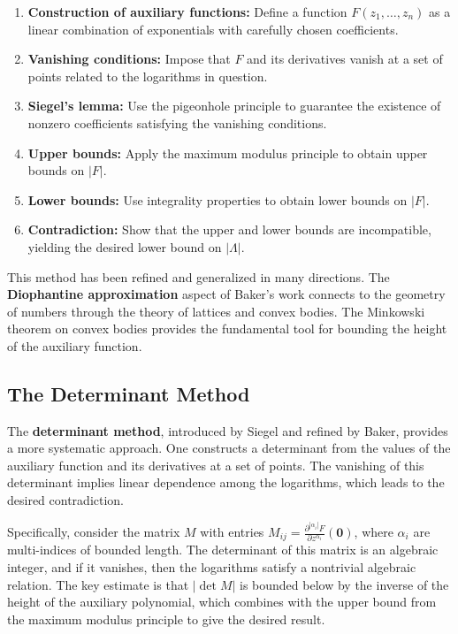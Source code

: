\begin{enumerate}
    \item \textbf{Construction of auxiliary functions:} Define a function $F(z_1, \ldots, z_n)$ as a linear combination of exponentials with carefully chosen coefficients.
    \item \textbf{Vanishing conditions:} Impose that $F$ and its derivatives vanish at a set of points related to the logarithms in question.
    \item \textbf{Siegel's lemma:} Use the pigeonhole principle to guarantee the existence of nonzero coefficients satisfying the vanishing conditions.
    \item \textbf{Upper bounds:} Apply the maximum modulus principle to obtain upper bounds on $|F|$.
    \item \textbf{Lower bounds:} Use integrality properties to obtain lower bounds on $|F|$.
    \item \textbf{Contradiction:} Show that the upper and lower bounds are incompatible, yielding the desired lower bound on $|\Lambda|$.
\end{enumerate}

This method has been refined and generalized in many directions. The \textbf{Diophantine approximation} aspect of Baker's work connects to the geometry of numbers through the theory of lattices and convex bodies. The Minkowski theorem on convex bodies provides the fundamental tool for bounding the height of the auxiliary function.

\subsection*{The Determinant Method}

The \textbf{determinant method}, introduced by Siegel and refined by Baker, provides a more systematic approach. One constructs a determinant from the values of the auxiliary function and its derivatives at a set of points. The vanishing of this determinant implies linear dependence among the logarithms, which leads to the desired contradiction.

Specifically, consider the matrix $M$ with entries $M_{ij} = \frac{\partial^{|\alpha_i|} F}{\partial z^{\alpha_i}}(\mathbf{0})$, where $\alpha_i$ are multi-indices of bounded length. The determinant of this matrix is an algebraic integer, and if it vanishes, then the logarithms satisfy a nontrivial algebraic relation. The key estimate is that $|\det M|$ is bounded below by the inverse of the height of the auxiliary polynomial, which combines with the upper bound from the maximum modulus principle to give the desired result.

